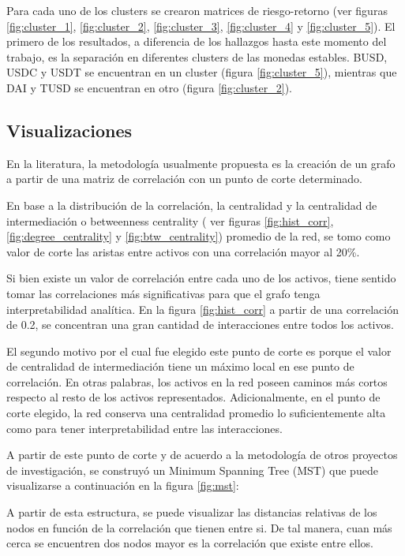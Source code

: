 \documentclass[runningheads,legalpaper,10pt]{etc/llncs}
\begin{document}
Para cada uno de los clusters se crearon matrices de riesgo-retorno (ver figuras \ref{fig:cluster_1}, \ref{fig:cluster_2}, \ref{fig:cluster_3}, \ref{fig:cluster_4} y \ref{fig:cluster_5}). 
El primero de los resultados, a diferencia de los hallazgos hasta este momento del trabajo, es la separación en diferentes clusters de las monedas estables. BUSD, USDC y USDT se encuentran en un cluster (figura \ref{fig:cluster_5}), mientras que DAI y TUSD se encuentran en otro (figura \ref{fig:cluster_2}).

\subsection{Visualizaciones} 


En la literatura, la metodología usualmente propuesta es la creación de un grafo a partir de una matriz de correlación con un punto de corte determinado.

En base a la distribución de la correlación, la centralidad y la centralidad de intermediación o betweenness centrality ( ver figuras \ref{fig:hist_corr}, \ref{fig:degree_centrality} y \ref{fig:btw_centrality}) promedio de la red, se tomo como valor de corte las aristas entre activos con una correlación mayor al 20\%. 

Si bien existe un valor de correlación entre cada uno de los activos, tiene sentido tomar las correlaciones más significativas para que el grafo tenga interpretabilidad analítica. En la figura \ref{fig:hist_corr} a partir de una correlación de 0.2, se concentran una gran cantidad de interacciones entre todos los activos. 

El segundo motivo por el cual fue elegido este punto de corte es porque el valor de centralidad de intermediación tiene un máximo local en ese punto de correlación. En otras palabras, los activos en la red poseen caminos más cortos respecto al resto de los activos representados. 
Adicionalmente, en el punto de corte elegido, la red conserva una centralidad promedio lo suficientemente alta como para tener interpretabilidad entre las interacciones.

A partir de este punto de corte y de acuerdo a la metodología de otros proyectos de investigación, se construyó un Minimum Spanning Tree (MST) que puede visualizarse a continuación en la figura \ref{fig:mst}:

A partir de esta estructura, se puede visualizar las distancias relativas de los nodos en función de la correlación que tienen entre si. De tal manera, cuan más cerca se encuentren dos nodos mayor es la correlación que existe entre ellos. 
\end{document}
